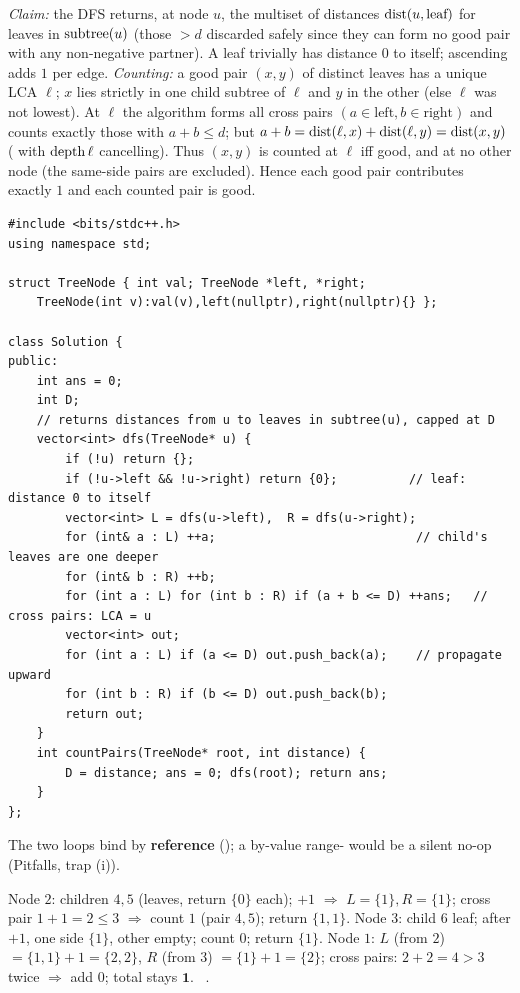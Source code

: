 \begin{proofbox}
\emph{Claim:} the DFS returns, at node $u$, the multiset of distances $\operatorname{dist}(u, \text{leaf})$
for leaves in $\operatorname{subtree}(u)$ (those $> d$ discarded safely since they can form no good pair with
any non-negative partner). A leaf trivially has distance $0$ to itself; ascending adds $1$ per
edge. \emph{Counting:} a good pair $(x,y)$ of distinct leaves has a unique LCA $\ell$; $x$
lies strictly in one child subtree of $\ell$ and $y$ in the other (else $\ell$ was not lowest).
At $\ell$ the algorithm forms all cross pairs $(a\in\text{left}, b\in\text{right})$ and counts
exactly those with $a+b \le d$; but $a+b = \operatorname{dist}(\ell,x)+\operatorname{dist}(\ell,y) = \operatorname{dist}(x,y)$
( with $\operatorname{depth}\ell$ cancelling). Thus $(x,y)$ is counted at $\ell$ iff good,
and at no other node (the same-side pairs are excluded). Hence each good pair contributes
exactly $1$ and each counted pair is good.
\end{proofbox}

\begin{lstlisting}[caption={Good Leaf Pairs by cross-counting at the LCA (LeetCode 1530)}, label={lst:c24-leafpairs}]
#include <bits/stdc++.h>
using namespace std;

struct TreeNode { int val; TreeNode *left, *right;
    TreeNode(int v):val(v),left(nullptr),right(nullptr){} };

class Solution {
public:
    int ans = 0;
    int D;
    // returns distances from u to leaves in subtree(u), capped at D
    vector<int> dfs(TreeNode* u) {
        if (!u) return {};
        if (!u->left && !u->right) return {0};          // leaf: distance 0 to itself
        vector<int> L = dfs(u->left),  R = dfs(u->right);
        for (int& a : L) ++a;                            // child's leaves are one deeper
        for (int& b : R) ++b;
        for (int a : L) for (int b : R) if (a + b <= D) ++ans;   // cross pairs: LCA = u
        vector<int> out;
        for (int a : L) if (a <= D) out.push_back(a);    // propagate upward
        for (int b : R) if (b <= D) out.push_back(b);
        return out;
    }
    int countPairs(TreeNode* root, int distance) {
        D = distance; ans = 0; dfs(root); return ans;
    }
};
\end{lstlisting}
\noindent The two \code{++} loops bind by \textbf{reference} (); a by-value
range- would be a silent no-op (Pitfalls, trap (i)).

\begin{tracebox}[$R$, \figref{c03-running}: leaves $4,5,6$, distance $=3$]
Node $2$: children $4,5$ (leaves, return $\{0\}$ each); $+1$ $\Rightarrow$ $L=\{1\},R=\{1\}$;
cross pair $1+1=2\le3$ $\Rightarrow$ count $1$ (pair $4,5$); return $\{1,1\}$.
Node $3$: child $6$ leaf; after $+1$, one side $\{1\}$, other empty; count $0$; return $\{1\}$.
Node $1$: $L$ (from $2$) $=\{1,1\}+1=\{2,2\}$, $R$ (from $3$) $=\{1\}+1=\{2\}$; cross pairs:
$2+2=4>3$ twice $\Rightarrow$ add $0$; total stays $\mathbf{1}$. \checkmark\
.
\end{tracebox}

